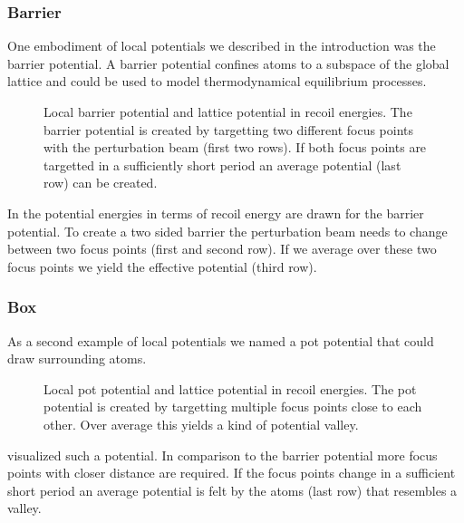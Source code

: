 \subsubsection{Barrier}

One embodiment of local potentials we described in the introduction was the
barrier potential. A barrier potential confines atoms to a subspace of the
global lattice and could be used to model thermodynamical equilibrium
processes.
\begin{figure}[htb]
  \centering
  \begin{adjustbox}{width=\textwidth}
    
  \end{adjustbox}
  \caption{Local barrier potential and lattice potential in recoil energies.
    The barrier potential is created by targetting two different focus points
    with the perturbation beam (first two rows). If both focus points are
    targetted in a sufficiently short period an average potential (last row)
    can be created.}\label{fig:effective_potential_barrier}
\end{figure}
In  the potential energies in terms
of recoil energy are drawn for the barrier potential. To create a two sided
barrier the perturbation beam needs to change between two focus points (first
and second row). If we average over these two focus points we yield the
effective potential (third row).

\subsubsection{Box}

As a second example of local potentials we named a pot potential that could
draw surrounding atoms.
\begin{figure}[htb]
  \centering
  \begin{adjustbox}{width=\textwidth}
    
  \end{adjustbox}
  \caption{Local pot potential and lattice potential in recoil energies. The
    pot potential is created by targetting multiple focus points close to
    each other. Over average this yields a kind of potential valley.
  }\label{fig:effective_potential_pot}
\end{figure}
 visualized such a potential. In comparison
to the barrier potential more focus points with closer distance are required.
If the focus points change in a sufficient short period an average potential
is felt by the atoms (last row) that resembles a valley.
